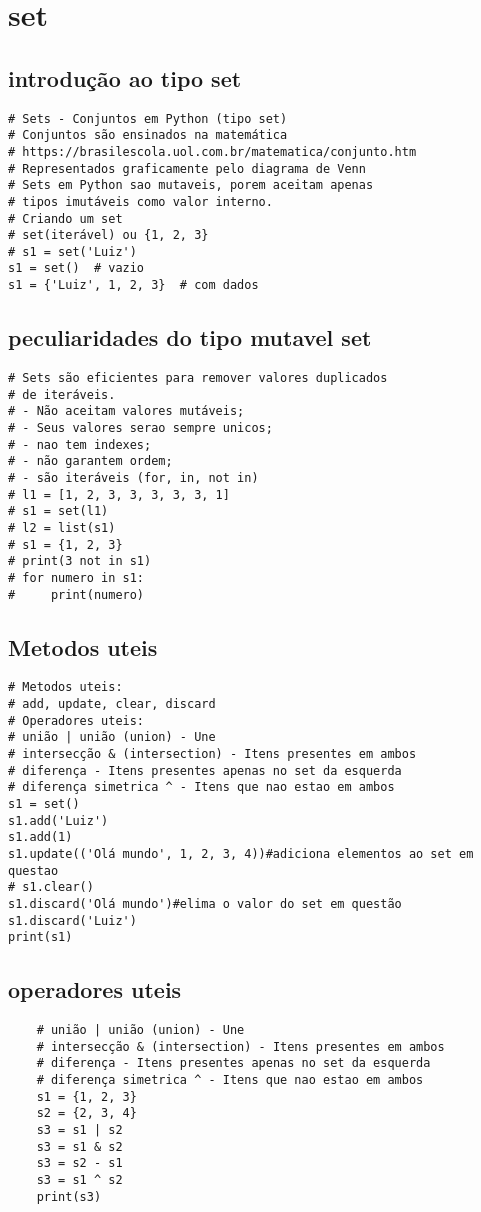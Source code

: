 \documentclass{article}
\begin{document}
\section{set}
\subsection{introdução ao tipo set}
\begin{lstlisting}
# Sets - Conjuntos em Python (tipo set)
# Conjuntos são ensinados na matemática
# https://brasilescola.uol.com.br/matematica/conjunto.htm
# Representados graficamente pelo diagrama de Venn
# Sets em Python sao mutaveis, porem aceitam apenas
# tipos imutáveis como valor interno.
# Criando um set
# set(iterável) ou {1, 2, 3}
# s1 = set('Luiz')
s1 = set()  # vazio
s1 = {'Luiz', 1, 2, 3}  # com dados
\end{lstlisting}
\subsection{peculiaridades do tipo mutavel set}
\begin{lstlisting}
# Sets são eficientes para remover valores duplicados
# de iteráveis.
# - Não aceitam valores mutáveis;
# - Seus valores serao sempre unicos;
# - nao tem indexes;
# - não garantem ordem;
# - são iteráveis (for, in, not in)
# l1 = [1, 2, 3, 3, 3, 3, 3, 1]
# s1 = set(l1)
# l2 = list(s1)
# s1 = {1, 2, 3}
# print(3 not in s1)
# for numero in s1:
#     print(numero)
\end{lstlisting}
\subsection{Metodos uteis}
\begin{lstlisting}
# Metodos uteis:
# add, update, clear, discard
# Operadores uteis:
# união | união (union) - Une
# intersecção & (intersection) - Itens presentes em ambos
# diferença - Itens presentes apenas no set da esquerda
# diferença simetrica ^ - Itens que nao estao em ambos
s1 = set()
s1.add('Luiz')
s1.add(1)
s1.update(('Olá mundo', 1, 2, 3, 4))#adiciona elementos ao set em questao
# s1.clear()
s1.discard('Olá mundo')#elima o valor do set em questão
s1.discard('Luiz')
print(s1) 
\end{lstlisting}
\subsection{operadores uteis}
\begin{lstlisting}
    # união | união (union) - Une
    # intersecção & (intersection) - Itens presentes em ambos
    # diferença - Itens presentes apenas no set da esquerda
    # diferença simetrica ^ - Itens que nao estao em ambos
    s1 = {1, 2, 3}
    s2 = {2, 3, 4}
    s3 = s1 | s2
    s3 = s1 & s2
    s3 = s2 - s1
    s3 = s1 ^ s2
    print(s3)
\end{lstlisting}
\end{document}
